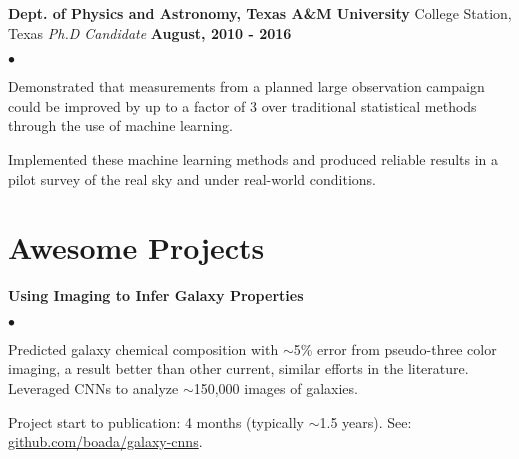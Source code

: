 \documentclass[margin,line, 11pt]{res}
\newenvironment{list2}{
  \begin{list}{$\bullet$}{%
      \setlength{\itemsep}{0in}
      \setlength{\parsep}{0in} \setlength{\parskip}{0in}
      \setlength{\topsep}{0in} \setlength{\partopsep}{0in}
      \setlength{\leftmargin}{0.2in}}}{\end{list}}
\begin{document}
\begin{resume}
\textbf{Dept. of Physics and Astronomy, Texas A\&M University} \hfill College Station, Texas\newline
\textit{Ph.D Candidate} \hfill \textbf{August, 2010 - 2016}\newline
    \begin{list2}
    	\vspace*{-5mm}
      \item Demonstrated that measurements from a planned large observation campaign could be improved by up to a factor of 3 over traditional statistical methods through the use of machine learning.
      \item Implemented these machine learning methods and produced reliable results in a pilot survey of the real sky and under real-world conditions.
    \end{list2}
\vspace*{-2mm}


\section{Awesome Projects}
\textbf{Using Imaging to Infer Galaxy Properties}\newline
    \begin{list2}
    	\vspace*{-5mm}
      \item Predicted galaxy chemical composition with $\sim$5\% error from pseudo-three color imaging, a result better than other current, similar efforts in the literature. Leveraged CNNs to analyze $\sim$150,000 images of galaxies.
      \item Project start to publication: 4 months (typically $\sim$1.5 years). See: \href{https://github.com/boada/galaxy-cnns}{github.com/boada/galaxy-cnns}.
    \end{list2}
    \vspace*{-3mm}


\end{resume}
\end{document}
